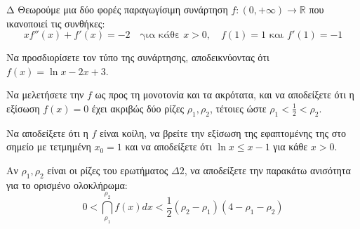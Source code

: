 \begin{thema}{Δ}
Θεωρούμε μια δύο φορές παραγωγίσιμη συνάρτηση $f: (0, +\infty) \to \mathbb{R}$ που ικανοποιεί τις συνθήκες:
\[ x f''(x) + f'(x) = -2 \quad \text{για κάθε } x > 0, \quad f(1)=1 \text{ και } f'(1)=-1 \]
\begin{erwthma}
    \item Να προσδιορίσετε τον τύπο της συνάρτησης, αποδεικνύοντας ότι $f(x) = \ln x - 2x + 3$.
    \item Να μελετήσετε την $f$ ως προς τη μονοτονία και τα ακρότατα, και να αποδείξετε ότι η εξίσωση $f(x) = 0$ έχει ακριβώς δύο ρίζες $\rho_1, \rho_2$, τέτοιες ώστε $\displaystyle \rho_1 < \frac{1}{2} < \rho_2$.
    \item Να αποδείξετε ότι η $f$ είναι κοίλη, να βρείτε την εξίσωση της εφαπτομένης της στο σημείο με τετμημένη $x_0 = 1$ και να αποδείξετε ότι $\ln x \le x - 1$ για κάθε $x > 0$.
    \item Αν $\rho_1, \rho_2$ είναι οι ρίζες του ερωτήματος $\Delta 2$, να αποδείξετε την παρακάτω ανισότητα για το ορισμένο ολοκλήρωμα:
    \[ 0 < \dint_{\rho_1}^{\rho_2} f(x) dx < \frac{1}{2}(\rho_2 - \rho_1)(4 - \rho_1 - \rho_2) \]
\end{erwthma}
\end{thema}
